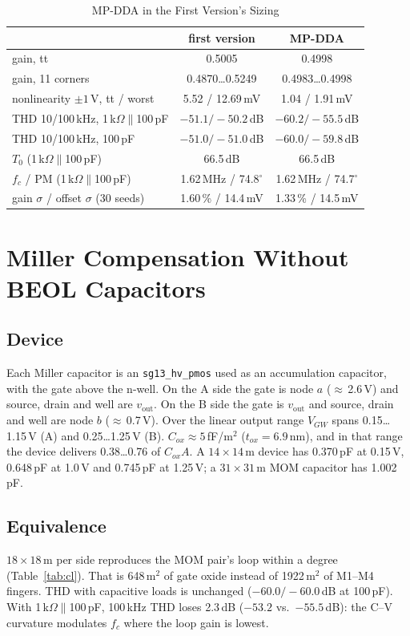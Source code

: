 \documentclass[journal]{IEEEtran}
\newcommand{\cell}[1]{\texttt{#1}}
\newcommand{\um}{\,\textmu m}
\newcommand{\umsq}{\,\textmu m$^2$}
\newcommand{\mV}{\,mV}
\newcommand{\dB}{\,dB}
\newcommand{\MHz}{\,MHz}
\newcommand{\pF}{\,pF}
\newcommand{\dg}{$^\circ$}
\newcommand{\RL}{1\,k$\Omega\parallel$100\,pF}
\newcommand{\vout}{v_\mathrm{out}}
\begin{document}
\begin{table}[!t]
\caption{MP-DDA in the First Version's Sizing}
\label{tab:mp}
\centering\footnotesize
\begin{tabularx}{\columnwidth}{@{}Lcc@{}}
\toprule
 & first version & MP-DDA\\
\midrule
gain, tt & 0.5005 & 0.4998\\
gain, 11 corners & 0.4870\ldots0.5249 & 0.4983\ldots0.4998\\
nonlinearity $\pm1$\,V, tt / worst & 5.52 / 12.69\mV & 1.04 / 1.91\mV\\
THD 10/100\,kHz, \RL & $-51.1/-50.2$\dB & $-60.2/-55.5$\dB\\
THD 10/100\,kHz, 100\pF & $-51.0/-51.0$\dB & $-60.0/-59.8$\dB\\
$T_0$ (\RL) & 66.5\dB & 66.5\dB\\
$f_c$ / PM (\RL) & 1.62\MHz{} / 74.8\dg & 1.62\MHz{} / 74.7\dg\\
gain $\sigma$ / offset $\sigma$ (30 seeds) & 1.60\,\% / 14.4\mV & 1.33\,\% / 14.5\mV\\
\bottomrule
\end{tabularx}
\end{table}

\section{Miller Compensation Without BEOL Capacitors}

\subsection{Device}
Each Miller capacitor is an \cell{sg13\_hv\_pmos} used as an accumulation capacitor, with
the gate above the n-well. On the A side the gate is node $a$ ($\approx$\,2.6\,V) and
source, drain and well are $\vout$. On the B side the gate is $\vout$ and source, drain and
well are node $b$ ($\approx$\,0.7\,V). Over the linear output range $V_{GW}$ spans
0.15\ldots1.15\,V (A) and 0.25\ldots1.25\,V (B). $C_{ox}\approx5$\,fF/\textmu m$^2$
($t_{ox}=6.9$\,nm), and in that range the device delivers 0.38\ldots0.76 of $C_{ox}A$. A
$14\times14$\um{} device has 0.370\pF{} at 0.15\,V, 0.648\pF{} at 1.0\,V and 0.745\pF{} at
1.25\,V; a $31\times31$\um{} MOM capacitor has 1.002\pF.

\subsection{Equivalence}
$18\times18$\um{} per side reproduces the MOM pair's loop within a degree
(Table~\ref{tab:cl}). That is 648\umsq{} of gate oxide instead of 1922\umsq{} of M1--M4
fingers. THD with capacitive loads is unchanged ($-60.0/-60.0$\dB{} at 100\pF). With \RL{},
100\,kHz THD loses 2.3\dB{} ($-53.2$ vs.\ $-55.5$\dB): the C--V curvature modulates $f_c$
where the loop gain is lowest.
\end{document}
